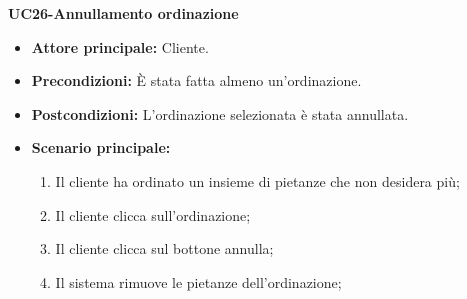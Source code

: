 \textbf{UC26-Annullamento ordinazione}
\begin{itemize}
\item \textbf{Attore principale:} Cliente.
\item \textbf{Precondizioni:} È stata fatta almeno un'ordinazione.
\item \textbf{Postcondizioni:} L'ordinazione selezionata è stata annullata.
\item \textbf{Scenario principale:}
\begin{enumerate}
    \item Il cliente ha ordinato un insieme di pietanze che non desidera più;
    \item Il cliente clicca sull'ordinazione;
    \item Il cliente clicca sul bottone annulla;
    \item Il sistema rimuove le pietanze dell'ordinazione;
\end{enumerate}
\end{itemize}
